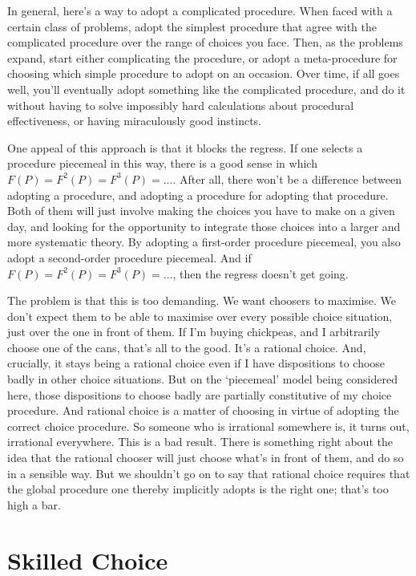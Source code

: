\documentclass[
  11pt,
  letterpaper,
  DIV=11,
  numbers=noendperiod,
  oneside]{scrartcl}
\begin{document}
In general, here's a way to adopt a complicated procedure. When faced
with a certain class of problems, adopt the simplest procedure that
agree with the complicated procedure over the range of choices you face.
Then, as the problems expand, start either complicating the procedure,
or adopt a meta-procedure for choosing which simple procedure to adopt
on an occasion. Over time, if all goes well, you'll eventually adopt
something like the complicated procedure, and do it without having to
solve impossibly hard calculations about procedural effectiveness, or
having miraculously good instincts.

One appeal of this approach is that it blocks the regress. If one
selects a procedure piecemeal in this way, there is a good sense in
which \(F(P) = F^2(P) = F^3(P) = \dots\). After all, there won't be a
difference between adopting a procedure, and adopting a procedure for
adopting that procedure. Both of them will just involve making the
choices you have to make on a given day, and looking for the opportunity
to integrate those choices into a larger and more systematic theory. By
adopting a first-order procedure piecemeal, you also adopt a
second-order procedure piecemeal. And if
\(F(P) = F^2(P) = F^3(P) = \dots\), then the regress doesn't get going.

The problem is that this is too demanding. We want choosers to maximise.
We don't expect them to be able to maximise over every possible choice
situation, just over the one in front of them. If I'm buying chickpeas,
and I arbitrarily choose one of the cans, that's all to the good. It's a
rational choice. And, crucially, it stays being a rational choice even
if I have dispositions to choose badly in other choice situations. But
on the `piecemeal' model being considered here, those dispositions to
choose badly are partially constitutive of my choice procedure. And
rational choice is a matter of choosing in virtue of adopting the
correct choice procedure. So someone who is irrational somewhere is, it
turns out, irrational everywhere. This is a bad result. There is
something right about the idea that the rational chooser will just
choose what's in front of them, and do so in a sensible way. But we
shouldn't go on to say that rational choice requires that the global
procedure one thereby implicitly adopts is the right one; that's too
high a bar.

\section{Skilled Choice}\label{skilled-choice}
\end{document}
